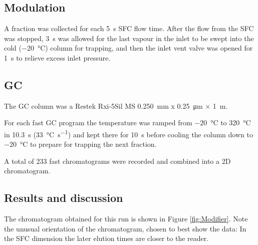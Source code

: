 \subsection{Modulation}

A fraction was collected for each \SI{5}{\second} SFC flow time. After the flow
from the SFC was stopped, \SI{3}{\second} was allowed for the last vapour in the
inlet to be swept into the cold (\SI{-20}{\celsius}) column for trapping, and
then the inlet vent valve was opened for \SI{1}{\second} to relieve excess inlet
pressure.

\subsection{GC}

The GC column was a Restek Rxi-5Sil MS \SI{0.250}{\milli\metre} x
\SI{0.25}{\micro\meter} × \SI{1}{\metre}.

For each fast GC program the temperature was ramped from \SI{-20}{\celsius} to
\SI{320}{\celsius} in \SI{10.3}{\second} (\SI{33}{\celsius\per\second}) and kept
there for \SI{10}{\second} before cooling the column down to \SI{-20}{\celsius}
to prepare for trapping the next fraction.

A total of 233 fast chromatograms were recorded and combined into a 2D
chromatogram.

\subsection{Results and discussion}

The chromatogram obtained for this run is shown in Figure \ref{fig:Modifier}.
Note the unusual orientation of the chromatogram, chosen to best show the data:
In the SFC dimension the later elution times are closer to the reader.

